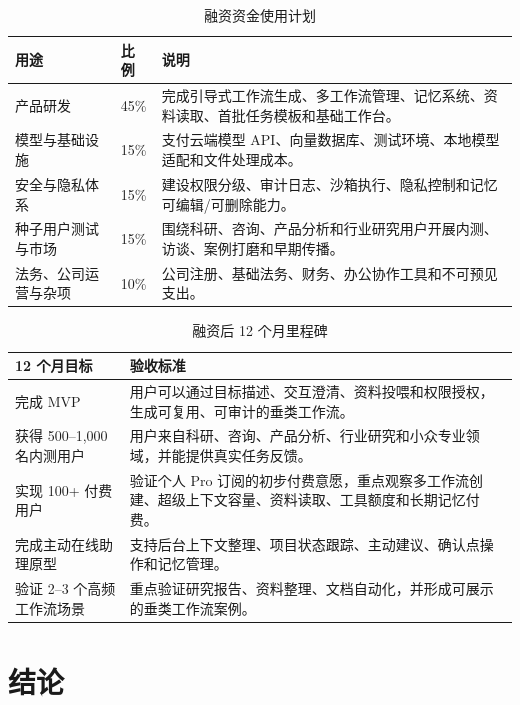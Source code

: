 \documentclass[12pt,a4paper]{ctexart}
\begin{document}
\begin{table}[htbp]
  \centering
  \begin{tabularx}{\textwidth}{p{4cm} p{2.5cm} X}
    \toprule
    \textbf{用途} & \textbf{比例} & \textbf{说明} \\
    \midrule
    产品研发 & 45\% & 完成引导式工作流生成、多工作流管理、记忆系统、资料读取、首批任务模板和基础工作台。 \\
    模型与基础设施 & 15\% & 支付云端模型 API、向量数据库、测试环境、本地模型适配和文件处理成本。 \\
    安全与隐私体系 & 15\% & 建设权限分级、审计日志、沙箱执行、隐私控制和记忆可编辑/可删除能力。 \\
    种子用户测试与市场 & 15\% & 围绕科研、咨询、产品分析和行业研究用户开展内测、访谈、案例打磨和早期传播。 \\
    法务、公司运营与杂项 & 10\% & 公司注册、基础法务、财务、办公协作工具和不可预见支出。 \\
    \bottomrule
  \end{tabularx}
  \caption{融资资金使用计划}
  \label{tab:funding-use}
\end{table}

\begin{table}[htbp]
  \centering
  \small
  \begin{tabularx}{\textwidth}{p{4cm} X}
    \toprule
    \textbf{12 个月目标} & \textbf{验收标准} \\
    \midrule
    完成 MVP & 用户可以通过目标描述、交互澄清、资料投喂和权限授权，生成可复用、可审计的垂类工作流。 \\
    获得 500--1,000 名内测用户 & 用户来自科研、咨询、产品分析、行业研究和小众专业领域，并能提供真实任务反馈。 \\
    实现 100+ 付费用户 & 验证个人 Pro 订阅的初步付费意愿，重点观察多工作流创建、超级上下文容量、资料读取、工具额度和长期记忆付费。 \\
    完成主动在线助理原型 & 支持后台上下文整理、项目状态跟踪、主动建议、确认点操作和记忆管理。 \\
    验证 2--3 个高频工作流场景 & 重点验证研究报告、资料整理、文档自动化，并形成可展示的垂类工作流案例。 \\
    \bottomrule
  \end{tabularx}
  \caption{融资后 12 个月里程碑}
  \label{tab:funding-milestones}
\end{table}

\section{结论}
\end{document}
